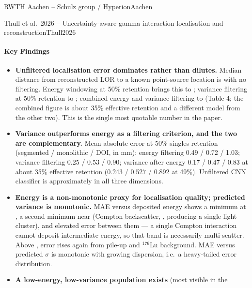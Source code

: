 \begin{programnote}{RWTH Aachen -- Schulz group / Hyperion}{Aachen}
\begin{papernote}{Thull et al.\ 2026 -- Uncertainty-aware gamma interaction localisation and reconstruction}{Thull2026}
\paragraph{Key Findings}
\begin{itemize}
    \item \textbf{Unfiltered localisation error dominates rather than dilutes.} Median
        distance from reconstructed LOR to a known point-source location is
        \textbf{} with no filtering. Energy windowing at 50\% retention brings this
        to ; variance filtering at 50\% retention to ; combined energy and
        variance filtering to \textbf{} (Table 4; the combined figure is
        about 35\% effective retention and a different model from the other two). This is the single most quotable number
        in the paper.
    \item \textbf{Variance outperforms energy as a filtering criterion, and the two are
        complementary.} Mean absolute error at 50\% singles retention (segmented /
        monolithic / DOI, in mm): energy filtering 0.49 / 0.72 / 1.03; variance filtering
        0.25 / 0.53 / 0.90; variance after energy 0.17 / 0.47 / 0.83 at about 35\%
        effective retention (0.243 / 0.527 / 0.892 at 49\%). Unfiltered CNN classifier is approximately  in all three
        dimensions.
    \item \textbf{Energy is a non-monotonic proxy for localisation quality; predicted
        variance is monotonic.} MAE versus deposited energy shows a minimum at , a
        second minimum near  (Compton backscatter, , producing a single
        light cluster), and elevated error between them --- a single Compton interaction
        cannot deposit intermediate energy, so that band is necessarily multi-scatter.
        Above , error rises again from pile-up and $^{176}$Lu background. MAE versus
        predicted $\sigma$ is monotonic with growing dispersion, i.e.\ a heavy-tailed error
        distribution.
    \item \textbf{A low-energy, low-variance population exists} (most visible in the

\end{itemize}
\end{papernote}
\end{programnote}
